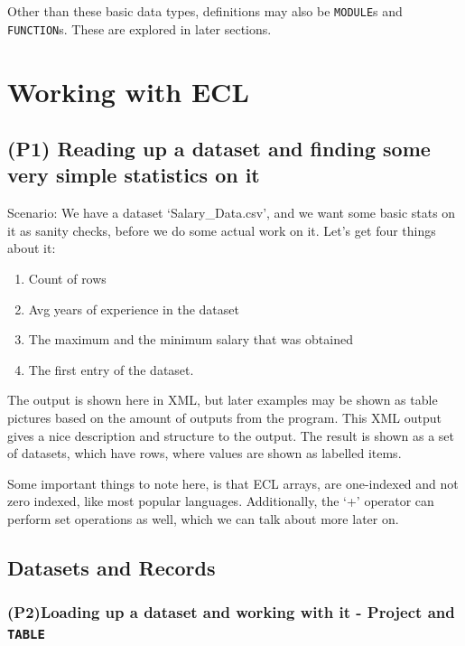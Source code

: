 Other than these basic data types, definitions may also be \lstinline{MODULE}s and \lstinline{FUNCTION}s. These are explored in later sections.

\section{Working with ECL}

\subsection[Simple Statistics on Datasets]{(P1) Reading up a dataset and finding some very simple statistics on it}

Scenario: We have a dataset `Salary\_Data.csv', and we want some basic stats on it as sanity checks, before we do some actual work on it. Let's get four things about it:

\begin{enumerate}
    \item Count of rows
    \item Avg years of experience in the dataset
    \item The maximum and the minimum salary that was obtained
    \item The first entry of the dataset.
\end{enumerate}



\pagebreak
The output is shown here in XML, but later examples may be shown as table pictures based on the amount of outputs from the program.
This XML output gives a nice description and structure to the output. The result is shown as a set of datasets, which have rows, where values are shown as labelled items.

Some important things to note here, is that ECL arrays, are one-indexed and not zero indexed, like most popular languages. 
Additionally, the `+' operator can perform set operations as well, which we can talk about more later on.




\subsection{Datasets and Records}

\subsubsection[Common data operations - Project and TABLE]{(P2)Loading up a dataset and working with it - Project and \lstinline{TABLE}}

